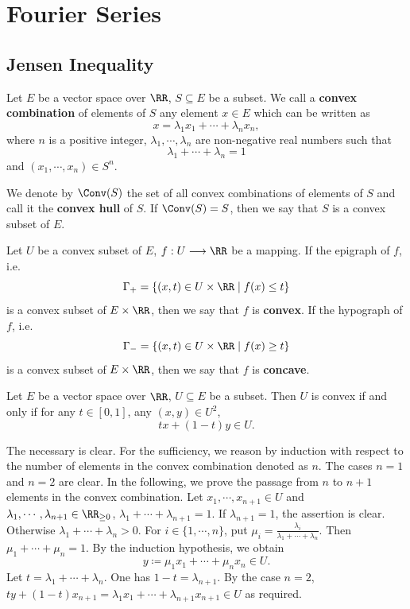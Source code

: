 \chapter{Fourier Series}

\section{Jensen Inequality}

\begin{definitionenv}
    Let $E$ be a vector space over $\RR$, $S \subseteq E$ be a subset.
    We call a \textbf{convex combination} of elements of $S$ any element $x \in E$ which can be written as
    $$x = \lambda_1 x_1 + \cdots + \lambda_n x_n,$$
    where $n$ is a positive integer, $\lambda_1,\cdots,\lambda_n$ are non-negative real numbers such that
    $$\lambda_1 + \cdots + \lambda_n = 1$$
    and $(x_1,\cdots,x_n) \in S^n$.

    \quad We denote by $\Conv(S)$ the set of all convex combinations of elements of $S$ and call it the \textbf{convex hull} of $S$.
    If $\Conv(S) = S$, then we say that $S$ is a convex subset of $E$.

    \quad Let $U$ be a convex subset of $E$, $f : U \longrightarrow \RR$ be a mapping.
    If the epigraph of $f$, i.e.
    $$\Gamma_{+} = \{(x,t) \in U \times \RR \mid f(x) \le t\}$$
    is a convex subset of $E \times \RR$, then we say that $f$ is \textbf{convex}.
    If the hypograph of $f$, i.e.
    $$\Gamma_{-} = \{(x,t) \in U \times \RR \mid f(x) \ge t\}$$
    is a convex subset of $E \times \RR$, then we say that $f$ is \textbf{concave}.
\end{definitionenv}

\begin{propositionenv}
    Let $E$ be a vector space over $\RR$, $U \subseteq E$ be a subset.
    Then $U$ is convex if and only if for any $t \in [0,1]$, any $(x,y) \in U^2$,
    $$tx + (1-t)y \in U.$$
\end{propositionenv}
\begin{proofenv}
    The necessary is clear. For the sufficiency, we reason by induction with respect to the number of elements in the convex combination denoted as $n$.
    The cases $n=1$ and $n=2$ are clear.
    In the following, we prove the passage from $n$ to $n+1$ elements in the convex combination.
    Let $x_1,\cdots,x_{n+1} \in U$ and $\lambda_1,\cdots,\lambda_{n+1} \in \RR_{\ge 0}$, $\lambda_1 + \cdots + \lambda_{n+1} = 1$.
    If $\lambda_{n+1}=1$, the assertion is clear. Otherwise $\lambda_1+\cdots+\lambda_n>0$.
    For $i \in \{1,\cdots,n\}$, put
    $\mu_i = \frac{\lambda_i}{\lambda_1 + \cdots + \lambda_n}$.
    Then $\mu_1 + \cdots + \mu_n = 1$.
    By the induction hypothesis, we obtain
    $$y \coloneq \mu_1 x_1 + \cdots + \mu_n x_n \in U.$$
    Let $t = \lambda_1 + \cdots + \lambda_n$.
    One has $1-t = \lambda_{n+1}$.
    By the case $n=2$, $ty + (1-t)x_{n+1} = \lambda_{1}x_1 + \cdots + \lambda_{n+1}x_{n+1} \in U$ as required.
\end{proofenv}

